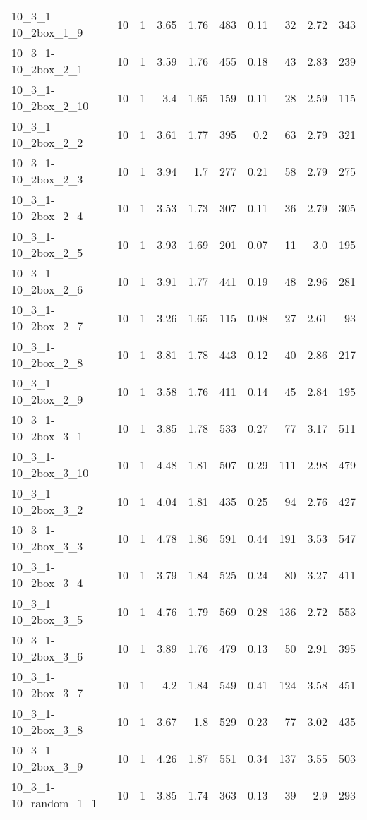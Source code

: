 \begin{center}
\begin{scriptsize}
\begin{longtable}{lrrrrrrrrr}
10\_3\_1-10\_2box\_1\_9 & 10 & 1 & 3.65 & 1.76 & 483 & 0.11 & 32 & 2.72 & 343\\
10\_3\_1-10\_2box\_2\_1 & 10 & 1 & 3.59 & 1.76 & 455 & 0.18 & 43 & 2.83 & 239\\
10\_3\_1-10\_2box\_2\_10 & 10 & 1 & 3.4 & 1.65 & 159 & 0.11 & 28 & 2.59 & 115\\
10\_3\_1-10\_2box\_2\_2 & 10 & 1 & 3.61 & 1.77 & 395 & 0.2 & 63 & 2.79 & 321\\
10\_3\_1-10\_2box\_2\_3 & 10 & 1 & 3.94 & 1.7 & 277 & 0.21 & 58 & 2.79 & 275\\
10\_3\_1-10\_2box\_2\_4 & 10 & 1 & 3.53 & 1.73 & 307 & 0.11 & 36 & 2.79 & 305\\
10\_3\_1-10\_2box\_2\_5 & 10 & 1 & 3.93 & 1.69 & 201 & 0.07 & 11 & 3.0 & 195\\
10\_3\_1-10\_2box\_2\_6 & 10 & 1 & 3.91 & 1.77 & 441 & 0.19 & 48 & 2.96 & 281\\
10\_3\_1-10\_2box\_2\_7 & 10 & 1 & 3.26 & 1.65 & 115 & 0.08 & 27 & 2.61 & 93\\
10\_3\_1-10\_2box\_2\_8 & 10 & 1 & 3.81 & 1.78 & 443 & 0.12 & 40 & 2.86 & 217\\
10\_3\_1-10\_2box\_2\_9 & 10 & 1 & 3.58 & 1.76 & 411 & 0.14 & 45 & 2.84 & 195\\
10\_3\_1-10\_2box\_3\_1 & 10 & 1 & 3.85 & 1.78 & 533 & 0.27 & 77 & 3.17 & 511\\
10\_3\_1-10\_2box\_3\_10 & 10 & 1 & 4.48 & 1.81 & 507 & 0.29 & 111 & 2.98 & 479\\
10\_3\_1-10\_2box\_3\_2 & 10 & 1 & 4.04 & 1.81 & 435 & 0.25 & 94 & 2.76 & 427\\
10\_3\_1-10\_2box\_3\_3 & 10 & 1 & 4.78 & 1.86 & 591 & 0.44 & 191 & 3.53 & 547\\
10\_3\_1-10\_2box\_3\_4 & 10 & 1 & 3.79 & 1.84 & 525 & 0.24 & 80 & 3.27 & 411\\
10\_3\_1-10\_2box\_3\_5 & 10 & 1 & 4.76 & 1.79 & 569 & 0.28 & 136 & 2.72 & 553\\
10\_3\_1-10\_2box\_3\_6 & 10 & 1 & 3.89 & 1.76 & 479 & 0.13 & 50 & 2.91 & 395\\
10\_3\_1-10\_2box\_3\_7 & 10 & 1 & 4.2 & 1.84 & 549 & 0.41 & 124 & 3.58 & 451\\
10\_3\_1-10\_2box\_3\_8 & 10 & 1 & 3.67 & 1.8 & 529 & 0.23 & 77 & 3.02 & 435\\
10\_3\_1-10\_2box\_3\_9 & 10 & 1 & 4.26 & 1.87 & 551 & 0.34 & 137 & 3.55 & 503\\
10\_3\_1-10\_random\_1\_1 & 10 & 1 & 3.85 & 1.74 & 363 & 0.13 & 39 & 2.9 & 293\\

\end{longtable}
\end{scriptsize}
\end{center}
